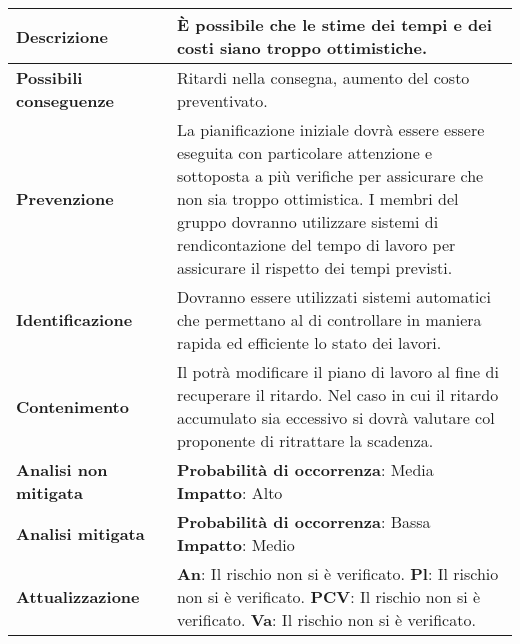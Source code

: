 	\small
	\begin{table}[H]
		\begin{center}			
			\begin{tabular}{p{2.5cm}p{0.5cm}p{11cm}}
				\arrayrulecolor{lightgray}
				
				\toprule				
				\textbf{Descrizione}
				& &
				È possibile che le stime dei tempi e dei costi siano troppo ottimistiche.
				\\
				\midrule
				\textbf{Possibili \newline conseguenze}
				& &
				Ritardi nella consegna, aumento del costo preventivato.
				\\
				\midrule
				\textbf{Prevenzione}
				& &
				La pianificazione iniziale dovrà essere essere eseguita con particolare attenzione e sottoposta a più verifiche per assicurare che non sia troppo ottimistica. I membri del gruppo dovranno utilizzare sistemi di rendicontazione del tempo di lavoro per assicurare il rispetto dei tempi previsti.
				\\
				\midrule
				\textbf{Identificazione}
				& &
				Dovranno essere utilizzati sistemi automatici che permettano al \responsabilediprogetto{} di controllare in maniera rapida ed efficiente lo stato dei lavori.
				\\
				\midrule
				\textbf{Contenimento}
				& &
				Il \responsabilediprogetto{} potrà modificare il piano di lavoro al fine di recuperare il ritardo. Nel caso in cui il ritardo accumulato sia eccessivo si dovrà valutare col proponente di ritrattare la scadenza.
				\\
				\midrule
				\textbf{Analisi \newline non mitigata}
				& &
				\textbf{Probabilità di occorrenza}: Media
				\newline
				\textbf{Impatto}: Alto
				\\
				\midrule
				\textbf{Analisi \newline mitigata}
				& &
				\textbf{Probabilità di occorrenza}: Bassa
				\newline
				\textbf{Impatto}: Medio
				\\
				\midrule
				\textbf{Attualizzazione}
				& &
				\textbf{An}:  Il rischio non si è verificato.
				\newline
				\textbf{Pl}: Il rischio non si è verificato.
				\newline
				\textbf{PCV}: Il rischio non si è verificato.
				\newline
				\textbf{Va}: Il rischio non si è verificato.
				\\
				
				\bottomrule	
			\end{tabular}
		\end{center}
	\end{table}			
	
